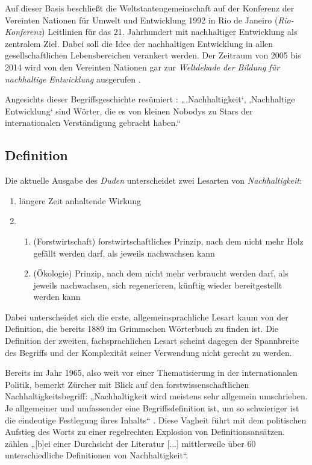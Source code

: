 \documentclass[
    german,
    a4paper,%
    12pt,%
    oneside,%
    toc=bibliography,
    final,
]{scrartcl}
\begin{document}
Auf dieser Basis beschließt die Weltstaatengemeinschaft auf der Konferenz der Vereinten Nationen für Umwelt und Entwicklung 1992 in Rio de Janeiro (\textit{Rio-Konferenz}) Leitlinien für das 21. Jahrhundert mit nachhaltiger Entwicklung als zentralem Ziel. Dabei soll die Idee der nachhaltigen Entwicklung in allen gesellschaftlichen Lebensbereichen verankert werden. Der Zeitraum von 2005 bis 2014 wird von den Vereinten Nationen gar zur \textit{Weltdekade der Bildung für nachhaltige Entwicklung} ausgerufen \citep[vgl.][12]{OhlmeierBrunold2015}.

Angesichts dieser Begriffsgeschichte resümiert \citet[10]{Ninck1997}: „‚Nachhaltigkeit‘, ‚Nachhaltige Entwicklung‘ sind Wörter, die es von kleinen Nobodys zu Stars der internationalen Verständigung gebracht haben.“

\subsection{Definition}
\label{subsec:definition}

Die aktuelle Ausgabe des \textit{Duden} unterscheidet zwei Lesarten von \textit{Nachhaltigkeit}:

\begin{enumerate}[rightmargin=1cm]
\item längere Zeit anhaltende Wirkung
\item 
	\begin{enumerate}
	\item (Forstwirtschaft) forstwirtschaftliches Prinzip, nach dem nicht mehr Holz gefällt werden darf, als jeweils nachwachsen kann
	\item (Ökologie) Prinzip, nach dem nicht mehr verbraucht werden darf, als jeweils nachwachsen, sich regenerieren, künftig wieder bereitgestellt werden kann
	\end{enumerate}
	\hfill\citep{Duden2017}
\end{enumerate}

Dabei unterscheidet sich die erste, allgemeinsprachliche Lesart kaum von der Definition, die bereits 1889 im Grimmschen Wörterbuch zu finden ist. Die Definition der zweiten, fachsprachlichen Lesart scheint dagegen der Spannbreite des Begriffs und der Komplexität seiner Verwendung nicht gerecht zu werden.

Bereits im Jahr 1965, also weit vor einer Thematisierung in der internationalen Politik, bemerkt Zürcher mit Blick auf den forstwissenschaftlichen Nachhaltigkeitsbegriff: „Nachhaltigkeit wird meistens sehr allgemein umschrieben. Je allgemeiner und umfassender eine Begriffsdefinition ist, um so schwieriger ist die eindeutige Festlegung ihres Inhalts“ \citep[94]{Zürcher1965}. Diese Vagheit führt mit dem politischen Aufstieg des Worts zu einer regelrechten Explosion von Definitionsansätzen. \citet[1]{Kastenholz-et-al1996} zählen „[b]ei einer Durchsicht der Literatur [...] mittlerweile über 60 unterschiedliche Definitionen von Nachhaltigkeit“.
\end{document}
